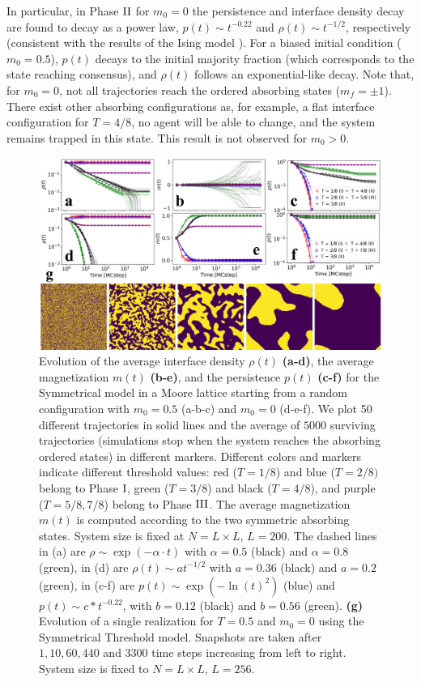 In particular, in Phase ${\rm II}$ for $m_0 = 0$ the persistence and interface density decay are found to decay as a power law, $p(t) \sim t^{-0.22}$ and $\rho(t) \sim t^{-1/2}$, respectively (consistent with the results of the Ising model \cite{stauffer-1994,derrida-1995A,derrida-1995B,derrida-1997}). For a biased initial condition ($m_0 = 0.5$), $p(t)$ decays to the initial majority fraction (which corresponds to the state reaching consensus), and $\rho(t)$ follows an exponential-like decay. Note that, for $m_0 = 0$, not all trajectories reach the ordered absorbing states ($m_f=\pm 1$). There exist other absorbing configurations as, for example,  a flat interface configuration for $T = 4/8$, no agent will be able to change, and the system remains trapped in this state. This result is not observed for $m_0 > 0$.
\begin{figure}[ht]
		\centering \captionsetup{font=sf}
		\includegraphics[width=\linewidth]{Figs/Aging_STM/FIG10_THESIS.pdf}
		\caption[Dynamical regimes in a Moore lattice.]{\label{fig:evolution_lattice} Evolution of the average interface density $\rho(t)$ \textbf{(a-d)}, the average magnetization $m(t)$ \textbf{(b-e)}, and the persistence $p(t)$ \textbf{(c-f)} for the Symmetrical model in a Moore lattice starting from a random configuration with $m_0 = 0.5$ (a-b-c) and $m_0 = 0$ (d-e-f). We plot 50 different trajectories in solid lines and the average of $5000$ surviving trajectories (simulations stop when the system reaches the absorbing ordered states) in different markers. Different colors and markers indicate different threshold values: red ($T = 1/8$) and blue ($T = 2/8)$ belong to Phase ${\rm I}$, green ($T = 3/8$) and black ($T=4/8$), and purple ($T = 5/8, 7/8$) belong to Phase ${\rm III}$. The average magnetization $m(t)$ is computed according to the two symmetric absorbing states. System size is fixed at $N = L \times L$, $L = 200$. The dashed lines in (a) are $\rho \sim \exp(-\alpha \cdot t)$ with $\alpha = 0.5$ (black) and $\alpha = 0.8$ (green), in (d) are $\rho(t) \sim at^{-1/2}$ with $a = 0.36$ (black) and $a = 0.2$ (green), in (c-f) are $p(t) \sim \exp(- \ln(t)^2)$ (blue) and $p(t) \sim c*t^{-0.22}$, with $b = 0.12$ (black) and $b = 0.56$ (green). \textbf{(g)} Evolution of a single realization for $T = 0.5$ and $m_0 = 0$ using the Symmetrical Threshold model. Snapshots are taken after $1,10,60,440$ and $3300$ time steps increasing from left to right. System size is fixed to $N = L \times L$, $L = 256$.
}
\end{figure}
